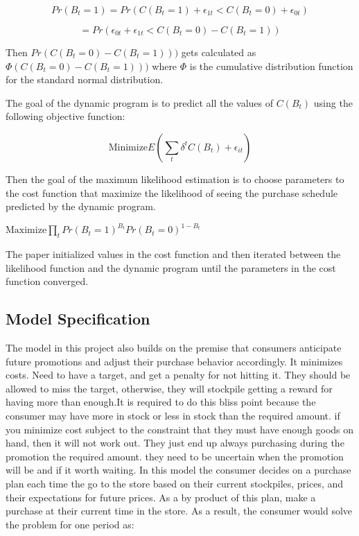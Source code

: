 \documentclass{article}
\begin{document}
$$Pr(B_t=1) = Pr(C(B_t = 1) + \epsilon_{1t} < C(B_t = 0) + \epsilon_{0t} )$$ 

$$=  Pr(  \epsilon_{0t} + \epsilon_{1t} < C(B_t = 0) - C(B_t = 1) )   $$

Then $Pr(C(B_t = 0) - C(B_t = 1) ) )$ gets calculated as $\Phi(C(B_t = 0) - C(B_t = 1) ) )$ where $\Phi$ is the cumulative distribution function for the standard normal distribution.

The goal of the dynamic program is to predict all the values of $C(B_t)$ using the following objective function:

$$\text{Minimize} E( \sum_t \delta^{t} C(B_t) + \epsilon_{it} )$$

Then the goal of the maximum likelihood estimation is to choose parameters to the cost function that maximize the likelihood of seeing the purchase schedule predicted by the dynamic program. 

$\text{Maximize} \prod_{t} Pr({B_t= 1})^{B_t} Pr(B_t=0)^{1-B_t} $

The paper initialized values in the cost function and then iterated between the likelihood function and the dynamic program until the parameters in the cost function converged.

\subsection{Model Specification}

The model in this project also builds on the premise that consumers anticipate future promotions and adjust their purchase behavior accordingly. It minimizes costs. Need to have a target, and get a penalty for not hitting it. They should be allowed to miss the target, otherwise, they will stockpile getting a reward for having more than enough.It is required to do this bliss point because the consumer may have more in stock or less in stock than the required amount. if you minimize cost subject to the constraint that they must have enough goods on hand, then it will not work out. They just end up always purchasing during the promotion the required amount. they need to be uncertain when the promotion will be and if it worth waiting. In this model the consumer decides on a purchase plan each time the go to the store based on their current stockpiles, prices, and their expectations for future prices. As a by product of this plan, make a purchase at their current time in the store. As a result, the consumer would solve the problem for one period as:
\end{document}
